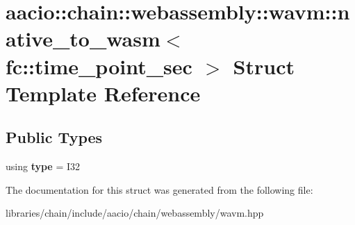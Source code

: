 \hypertarget{structaacio_1_1chain_1_1webassembly_1_1wavm_1_1native__to__wasm_3_01fc_1_1time__point__sec_01_4}{}\section{aacio\+:\+:chain\+:\+:webassembly\+:\+:wavm\+:\+:native\+\_\+to\+\_\+wasm$<$ fc\+:\+:time\+\_\+point\+\_\+sec $>$ Struct Template Reference}
\label{structaacio_1_1chain_1_1webassembly_1_1wavm_1_1native__to__wasm_3_01fc_1_1time__point__sec_01_4}
\subsection*{Public Types}
\begin{DoxyCompactItemize}
\item 
\mbox{\label{structaacio_1_1chain_1_1webassembly_1_1wavm_1_1native__to__wasm_3_01fc_1_1time__point__sec_01_4_a971dccbec489eb643231a2930ed820ab}} 
using {\bfseries type} = I32
\end{DoxyCompactItemize}


The documentation for this struct was generated from the following file\+:\begin{DoxyCompactItemize}
\item 
libraries/chain/include/aacio/chain/webassembly/wavm.\+hpp\end{DoxyCompactItemize}
